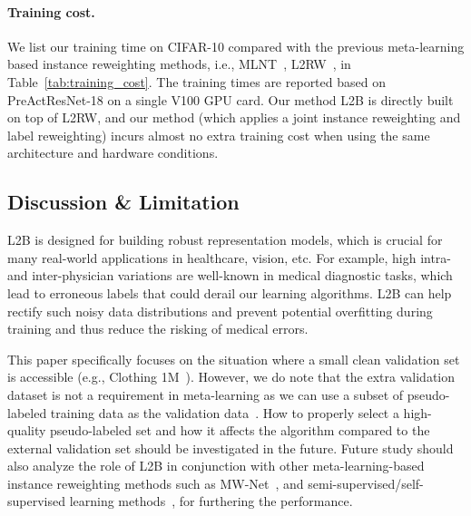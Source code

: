 \documentclass{article}
\begin{document}
\paragraph{Training cost.}
We list our training time on CIFAR-10 compared with the previous meta-learning based instance reweighting methods, i.e., MLNT~\cite{li2019learning}, L2RW~\cite{ren2018learning}, in Table~\ref{tab:training_cost}. The training times are reported based on PreActResNet-18 on a single V100 GPU card. Our method L2B is directly built on top of L2RW, and our method (which applies a joint instance reweighting and label reweighting) incurs almost no extra training cost when using the same architecture and hardware conditions.

\begin{table}[h]
\footnotesize
\centering
\caption{Training time comparison of MLNT~\cite{li2019learning}, L2RW~\cite{ren2018learning} and L2B (Ours). Our L2B incurs almost no additional training cost when using the same architecture and hardware conditions.}
\vspace{-1em}
\label{tab:training_cost}
\vspace{-1.2em}
\end{table} 



\subsection{Discussion \& Limitation}
L2B is designed for building robust representation models, which is crucial for many real-world applications in healthcare, vision, etc. For example, high intra- and inter-physician variations are well-known in medical diagnostic tasks, which lead to erroneous labels that could derail our learning algorithms. 
L2B can help rectify such noisy data distributions and prevent potential overfitting during training and thus reduce the risking of medical errors.

This paper specifically focuses on the situation where a small clean validation set is accessible (e.g., Clothing 1M~\cite{xiao2015learning}).
However, we do note that the extra validation dataset is not a requirement in meta-learning as we can use a subset of pseudo-labeled training data as
the validation data~\cite{xu2021faster}. 
How to properly select a high-quality pseudo-labeled set and how it affects the algorithm compared to the external validation set should be investigated in the future.
Future study should also analyze the role of L2B in conjunction with other meta-learning-based instance reweighting methods such as MW-Net~\cite{shu2019meta}, and semi-supervised/self-supervised learning methods~\cite{li2020dividemix,Li_2021_ICCV}, for furthering the performance.
\end{document}
